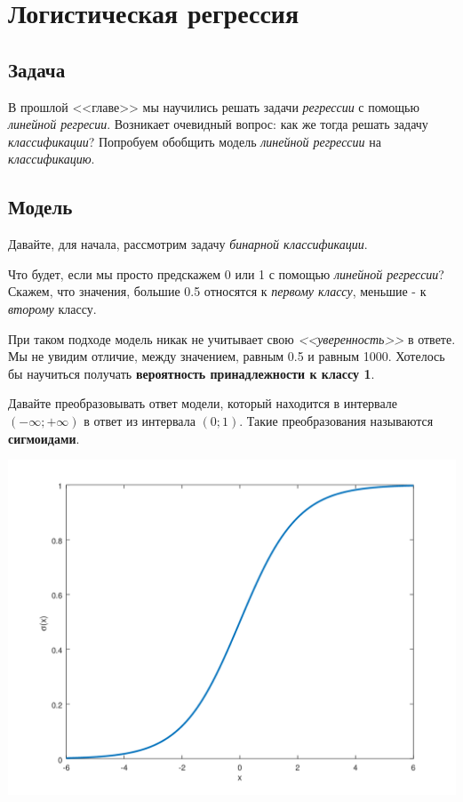  \section{Логистическая регрессия}
 
 \subsection{Задача}
 
 В прошлой <<главе>> мы научились решать задачи \textit{регрессии} с помощью \textit{линейной регресии}. Возникает очевидный вопрос: как же тогда решать задачу \textit{классификации}? Попробуем обобщить модель \textit{линейной регрессии} на \textit{классификацию}.
 
 \subsection{Модель}
 Давайте, для начала, рассмотрим задачу \textit{бинарной классификации}.
 
 Что будет, если мы просто предскажем 0 или 1 с помощью \textit{линейной регрессии}? Скажем, что значения, большие 0.5 относятся к \textit{первому классу}, меньшие - к \textit{второму} классу.
 
При таком подходе модель никак не учитывает свою \textit{<<уверенность>>} в ответе. Мы не увидим отличие, между значением, равным 0.5 и равным 1000. Хотелось бы научиться получать \textbf{вероятность принадлежности к классу 1}.

Давайте преобразовывать ответ модели, который находится в интервале $(-\infty;+\infty)$ в ответ из интервала $(0; 1)$. Такие преобразования называются \textbf{сигмоидами}.

\begin{center}
    \includegraphics[scale=0.65]{tickets/pictures/sigmoid_function.png}
\end{center}

